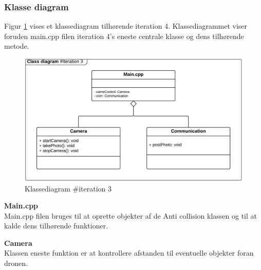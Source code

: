 \subsubsection*{Klasse diagram}

Figur \ref{fig:classDiagram_iteration3} vises et klassediagram tilhørende iteration 4. Klassediagrammet viser foruden main.cpp filen iteration 4's eneste centrale klasse og dens tilhørende metode. 

\begin{figure}[H]
	\centering
	\includegraphics[width=1\textwidth]{Billeder/klasse_diagrammer/classdiagram_iteration3.png}
	\vspace{-0.5cm}
	\caption{Klassediagram \#iteration 3}
	\label{fig:classDiagram_iteration3}
\end{figure}

\textbf{Main.cpp} \\
Main.cpp filen bruges til at oprette objekter af de Anti collision klassen og til at kalde dens tilhørende funktioner.

\textbf{Camera} \\
Klassen eneste funktion er at kontrollere afstanden til eventuelle objekter foran dronen. 





